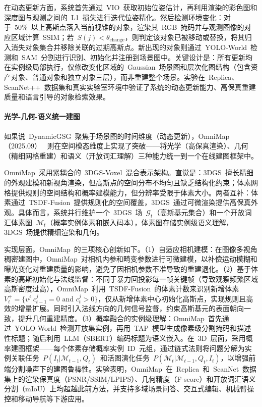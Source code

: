 在动态更新方面，系统首先通过~VIO~获取初始位姿估计，再利用渲染的彩色图和深度图与观测之间的~L1~损失进行迭代位姿精化。然后检测环境变化：对于~50\%~以上高斯点落入当前视锥的对象，渲染其~RGB~掩码并与观测图像的对应区域计算~SSIM；若~$S(j) < \theta_{\text{change}}$，则判定该对象已被移动或替换，将其归入消失对象集合并移除关联的过期高斯点。新出现的对象则通过~YOLO-World~检测和~SAM~分割进行识别、初始化并注册到场景图中。关键设计是：所有更新均在实例级局部执行，仅修改变化区域的~Gaussian~场景图和层次化图结构（包含资产对象、普通对象和独立对象三层），而非重建整个场景。实验在~Replica、ScanNet++~数据集和真实实验室环境中验证了系统的动态更新能力、高保真重建质量和语言引导的对象检索效果。

\paragraph{光学-几何-语义统一建图}

如果说~DynamicGSG~聚焦于场景图的时间维度（动态更新），OmniMap（2025.09）~\cite{2509_07500} 则在空间模态维度上实现了突破——将光学（高保真渲染）、几何（精细网格重建）和语义（开放词汇理解）三种能力统一到一个在线建图框架中。

OmniMap~采用紧耦合的~3DGS-Voxel~混合表示架构。直觉是：3DGS~擅长精细的外观建模和新视角渲染，但高斯点的空间分布不均匀且缺乏结构化约束；体素网格提供规则的空间结构和概率建模能力，但分辨率受限于体素大小。两者互补：体素通过~TSDF-Fusion~提供规则化的空间覆盖，3DGS~通过可微渲染提供高保真外观。具体而言，系统并行维护一个~3DGS~场~$\mathcal{G}_t$（高斯基元集合）和一个开放词汇体素图~$\mathcal{M}_t$（概率实例体素和嵌入码本），体素图存储实例级语义理解，3DGS~场提供精细渲染和几何。

实现层面，OmniMap~的三项核心创新如下。（1）自适应相机建模：在图像多视角稠密建图中，OmniMap~对相机内参和畸变参数进行可微建模，以补偿运动模糊和曝光变化对重建质量的影响，避免了因相机参数不准导致的重建退化。（2）基于体素的高斯初始化与法线监督：不同于暴力回投影每一帧关键帧（导致观察频繁区域高斯密度过高），OmniMap~利用~TSDF-Fusion~的体素计数来识别新增体素~$V_t^+ = \{v^j | c_{t-1}^j = 0 \text{ and } c_t^j > 0\}$，仅从新增体素中心初始化高斯点，实现规则且高效的增量扩展。同时引入法线方向的几何信号监督，约束高斯基元的表面朝向一致，提升几何重建精度。（3）概率融合的实例级理解：OmniMap~首先通过~YOLO-World~检测开放集实例，再用~TAP~模型生成像素级分割掩码和描述性标题；随后利用~LLM（SBERT）编码标题为语义嵌入。在~3D~层面，采用概率建图框架——每个体素存储概率实例~ID~元组，通过链式法则将问题分解为实例关联任务~$P(I_t | \mathcal{M}_{t-1}, Q_t)$~和活图演化任务~$P(\mathcal{M}_t | \mathcal{M}_{t-1}, Q_t, I_t)$，以增强前端分割噪声下的建图鲁棒性。实验表明，OmniMap~在~Replica~和~ScanNet~数据集上的渲染保真度（PSNR/SSIM/LPIPS）、几何精度（F-score）和开放词汇语义分割（mIoU）上均超越此前方法，并支持多域场景问答、交互式编辑、机械臂操控和移动导航等下游应用。

